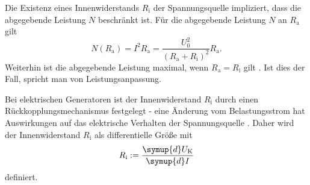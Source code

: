 Die Existenz eines Innenwiderstands $R_{\text{i}}$ der Spannungsquelle impliziert, dass die abgegebende Leistung $N$ beschränkt ist.
Für die abgegebende Leistung $N$ an $R_{\text{a}}$ gilt \cite{demi}
\begin{equation}
	N(R_{\text{a}}) = I^2 R_{\text{a}} = \frac{U_0^2}{(R_{\text{a}} + R_{\text{i}})^2} R_{\text{a}} \text{.}
\end{equation}
Weiterhin ist die abgegebende Leistung maximal, wenn $R_{\text{a}} = R_{\text{i}}$ gilt \cite{demi}.
Ist dies der Fall, spricht man von Leistungsanpassung.

Bei elektrischen Generatoren ist der Innenwiderstand $R_{\text{i}}$ durch einen Rückkopplungsmechanismus festgelegt - eine Änderung vom Belastungsstrom hat Auswirkungen auf das elektrische Verhalten der Spannungsquelle \cite{Anleitung}. Daher wird der Innenwiderstand $R_{\text{i}}$ als differentielle Größe mit
\begin{equation}
	R_{\text{i}} := \frac{\symup{d}U_{\text{K}}}{\symup{d}I}
\end{equation}
definiert.
